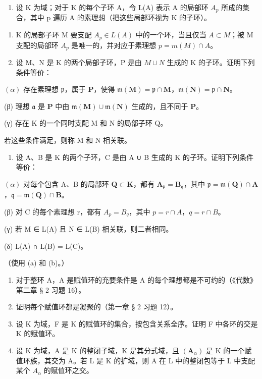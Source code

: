 
\begin{enumerate}
\def\labelenumi{\arabic{enumi}.}
\tightlist
\item
  设 K 为域；对于 K 的每个子环 A，令 L(A) 表示 A 的局部环 \(A_{p}\) 所成的集合，其中 p 遍历 A 的素理想（把这些局部环视为 K 的子环）。
\end{enumerate}

\begin{enumerate}
\def\labelenumi{(\alph{enumi})}
\item
  K 的局部子环 M 要支配 \(A_{p} \in L(A)\) 中的一个环，当且仅当 \(A \subset M\)；被 M 支配的局部环 \(A_{p}\) 是唯一的，并对应于素理想 \(p = m(M) \cap A\)。
\item
  设 M、N 是 K 的两个局部子环，P 是由 \(M \cup N\) 生成的 K 的子环。证明下列条件等价：
\end{enumerate}

\((\alpha)\) 存在素理想 \(\mathfrak{p}\)，属于 \(\mathbf{P}\)，使得 \(\mathfrak{m}(\mathbf{M}) = \mathfrak{p} \cap \mathbf{M}\)，\(\mathfrak{m}(\mathbf{N}) = \mathfrak{p} \cap \mathbf{N}\)。

(β) 理想 \(\mathfrak{a}\) 是 \(\mathbf{P}\) 中由 \(\mathfrak{m}(\mathbf{M}) \cup \mathfrak{m}(\mathbf{N})\) 生成的，且不同于 \(\mathbf{P}\)。

(γ) 存在 K 的一个同时支配 M 和 N 的局部子环 Q。

若这些条件满足，则称 M 和 N 相关联。

\begin{enumerate}
\def\labelenumi{(\alph{enumi})}
\setcounter{enumi}{2}
\tightlist
\item
  设 A、B 是 K 的两个子环，C 是由 A ∪ B 生成的 K 的子环。证明下列条件等价：
\end{enumerate}

\((\alpha)\) 对每个包含 A、B 的局部环 \(\mathbf{Q} \subset \mathbf{K}\)，都有 \(\mathbf{A}_{\mathfrak{p}} = \mathbf{B}_{\mathfrak{q}}\)，其中 \(\mathfrak{p} = \mathfrak{m}(\mathbf{Q}) \cap \mathbf{A}\)，\(\mathfrak{q} = \mathfrak{m}(\mathbf{Q}) \cap \mathbf{B}\)。

(β) 对 C 的每个素理想 r，都有 \(A_{p} = B_{q}\)，其中 \(p = r \cap A\)，\(q = r \cap B\)。

(γ) 若 M ∈ L(A) 且 N ∈ L(B) 相关联，则二者相同。

(δ) L(A) ∩ L(B) = L(C)。

（使用 (a) 和 (b)。）

\begin{enumerate}
\def\labelenumi{\arabic{enumi}.}
\setcounter{enumi}{1}
\item
  对于整环 A，A 是赋值环的充要条件是 A 的每个理想都是不可约的（《代数》第二章 § 2 习题 16）。
\item
  证明每个赋值环都是凝聚的（第一章 § 2 习题 12）。
\item
  设 K 为域，F 是 K 的赋值环的集合，按包含关系全序。证明 F 中各环的交是 K 的赋值环。
\item
  设 K 为域，A 是 K 的整闭子域，K 是其分式域，且 \((\mathbf{A}_{\alpha})\) 是 K 的一个赋值环族，其交为 A。若 L 是 K 的扩域，则 A 在 L 中的整闭包等于 L 中支配某个 \(A_{\alpha}\) 的赋值环之交。
\end{enumerate}

